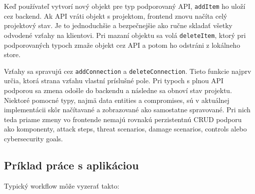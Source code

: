 \documentclass[11pt]{article}
\begin{document}
Keď používateľ vytvorí nový objekt pre typ podporovaný API, \texttt{addItem} ho uloží cez backend. Ak API vráti objekt s projektom, frontend znovu načíta celý projektový stav. Je to jednoduchšie a bezpečnejšie ako ručne skladať všetky odvodené vzťahy na klientovi. Pri mazaní objektu sa volá \texttt{deleteItem}, ktorý pri podporovaných typoch zmaže objekt cez API a potom ho odstráni z lokálneho store.

Vzťahy sa spravujú cez \texttt{addConnection} a \texttt{deleteConnection}. Tieto funkcie najprv určia, ktorá strana vzťahu vlastní príslušné pole. Pri typoch s plnou API podporou sa zmena odošle do backendu a následne sa obnoví stav projektu. Niektoré pomocné typy, najmä data entities a compromises, sú v aktuálnej implementácii skôr načítavané a zobrazované ako samostatne spravované. Pri nich teda priame zmeny vo frontende nemajú rovnakú perzistentnú CRUD podporu ako komponenty, attack steps, threat scenarios, damage scenarios, controls alebo cybersecurity goals.

\subsection{Príklad práce s aplikáciou}

Typický workflow môže vyzerať takto:
\end{document}
